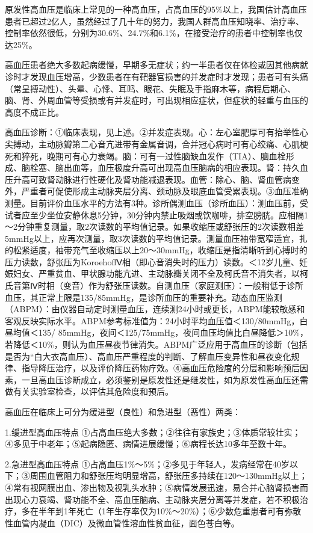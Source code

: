 原发性高血压是临床上常见的一种高血压，占高血压的95\%以上，我国估计高血压患者已超过2亿人，虽然经过了几十年的努力，我国人群高血压知晓率、治疗率、控制率依然很低，分别为30.6\%、24.7\%和6.1\%，在接受治疗的患者中控制率也仅达25\%。

高血压患者绝大多数起病缓慢，早期多无症状；约一半患者仅在体检或因其他病就诊时才发现血压增高，少数患者在有靶器官损害的并发症时才发现；患者可有头痛（常呈搏动性）、头晕、心悸、耳鸣、眼花、失眠及手指麻木等，病程后期心、脑、肾、外周血管等受损或有并发症时，可出现相应症状，但症状的轻重与血压的高度不成正比。

高血压诊断：①临床表现，见上述。②并发症表现。心：左心室肥厚可有抬举性心尖搏动，主动脉瓣第二心音亢进带有金属音调，合并冠心病时可有心绞痛、心肌梗死和猝死，晚期可有心力衰竭。脑：可有一过性脑缺血发作（TIA）、脑血栓形成、脑栓塞、脑出血等，血压极度升高可出现高血压脑病的相应表现。肾：持久血压升高可致肾动脉进行性硬化及肾功能减退表现。血管：除心、脑、肾血管病变外，严重者可促使形成主动脉夹层分离、颈动脉及眼底血管受累表现。③血压准确测量。目前评价血压水平的方法有3种。诊所偶测血压（诊所血压）：测血压前，受试者应至少坐位安静休息5分钟，30分钟内禁止吸烟或饮咖啡，排空膀胱。应相隔1～2分钟重复测量，取2次读数的平均值记录。如果收缩压或舒张压的2次读数相差5mmHg以上，应再次测量，取3次读数的平均值记录。测量血压袖带宽窄适宜，扎的松紧适度，袖带充气至收缩压以上20～30mmHg，收缩压是指清晰听到心搏时的压力读数，舒张压为KoroehoffⅤ相（即心音消失时的压力）读数。＜12岁儿童、妊娠妇女、严重贫血、甲状腺功能亢进、主动脉瓣关闭不全及柯氏音不消失者，以柯氏音第Ⅳ时相（变音）作为舒张压读数。自测血压（家庭测压）：一般稍低于诊所血压，其正常上限是135/85mmHg，是诊所血压的重要补充。动态血压监测（ABPM）：由仪器自动定时测量血压，连续测24小时或更长，ABPM能较敏感和客观反映实际水平。ABPM参考标准值为：24小时平均血压值＜130/80mmHg，白昼均值＜135/
85mmHg，夜间＜125/75mmHg，夜间血压均值比白昼降低＞10\%，若降低＜10\%，则认为血压昼夜节律消失。ABPM广泛应用于高血压的诊断（包括是否为“白大衣高血压）、高血压严重程度的判断、了解血压变异性和昼夜变化规律、指导降压治疗，以及评价降压药物疗效。④高血压危险度的分层和影响预后因素，一旦高血压诊断成立，必须鉴别是原发性还是继发性，如为原发性高血压还需做有关实验室检查，以评估其危险度和预后。

高血压在临床上可分为缓进型（良性）和急进型（恶性）两类：

1.缓进型高血压特点
①占高血压绝大多数；②往往有家族史；③体质常较壮实；④多见于中老年；⑤起病隐匿、病情进展缓慢；⑥病程长达10多年至数十年。

2.急进型高血压特点
①占高血压1\%～5\%；②多见于年轻人，发病经常在40岁以下；③周围血管阻力和舒张压均明显增高，舒张压多持续在120～130mmHg以上；④常有视网膜出血、渗出物及视乳头水肿；⑤病情发展迅速，易合并心脑肾损害而出现心力衰竭、肾功能不全、高血压脑病、主动脉夹层分离等并发症，若不积极治疗，多在半年到1年死亡（1年生存率仅为10\%～20\%）；⑥少数危重患者可有弥散性血管内凝血（DIC）及微血管性溶血性贫血征，面色苍白等。

